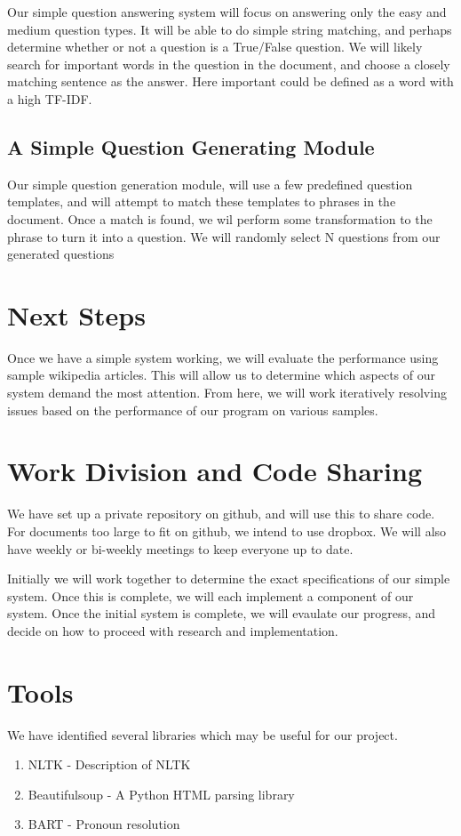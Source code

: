 \documentclass[12pt]{article}
\begin{document}
Our simple question answering system will focus on answering only the easy and medium question types. It will be able to do simple string matching, and perhaps determine whether or not a question is a True/False question. We will likely search for important words in the question in the document, and choose a closely matching sentence as the answer. Here important could be defined as a word with a high TF-IDF.

\subsection{A Simple Question Generating Module}

Our simple question generation module, will use a few predefined question templates, and will attempt to match these templates to phrases in the document. Once a match is found, we wil perform some transformation to the phrase to turn it into a question. We will randomly select N questions from our generated questions


\section{Next Steps}

Once we have a simple system working, we will evaluate the performance using sample wikipedia articles. This will allow us to determine which aspects of our system demand the most attention. From here, we will work iteratively resolving issues based on the performance of our program on various samples. 

\section{Work Division and Code Sharing}

We have set up a private repository on github, and will use this to share code. For documents too large to fit on github, we intend to use dropbox. We will also have weekly or bi-weekly meetings to keep everyone up to date.


Initially we will work together to determine the exact specifications of our simple system. Once this is complete, we will each implement a component of our system. Once the initial system is complete, we will evaulate our progress, and decide on how to proceed with research and implementation.

\section{Tools}

We have identified several libraries which may be useful for our project.

\begin{enumerate}
\item NLTK - Description of NLTK 
\item Beautifulsoup - A Python HTML parsing library
\item BART - Pronoun resolution
\end{enumerate}
\end{document}
